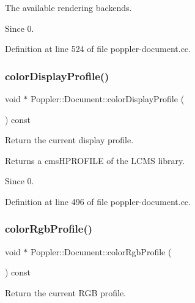 The available rendering backends.

\begin{DoxySince}{Since}
0. 
\end{DoxySince}


Definition at line 524 of file poppler-\/document.\+cc.

\mbox{\label{class_poppler_1_1_document_a48f8c5ecc4e261d6059ca055912adf6a}} 
\subsubsection{\texorpdfstring{color\+Display\+Profile()}{colorDisplayProfile()}}
{\footnotesize\ttfamily void $\ast$ Poppler\+::\+Document\+::color\+Display\+Profile (\begin{DoxyParamCaption}{ }\end{DoxyParamCaption}) const}

Return the current display profile.

\begin{DoxyReturn}{Returns}
a {\ttfamily cms\+H\+P\+R\+O\+F\+I\+LE} of the L\+C\+MS library.
\end{DoxyReturn}
\begin{DoxySince}{Since}
0. 
\end{DoxySince}


Definition at line 496 of file poppler-\/document.\+cc.

\mbox{\label{class_poppler_1_1_document_a9f234d4f9b916787d88bfda9b29af08e}} 
\subsubsection{\texorpdfstring{color\+Rgb\+Profile()}{colorRgbProfile()}}
{\footnotesize\ttfamily void $\ast$ Poppler\+::\+Document\+::color\+Rgb\+Profile (\begin{DoxyParamCaption}{ }\end{DoxyParamCaption}) const}

Return the current R\+GB profile.

